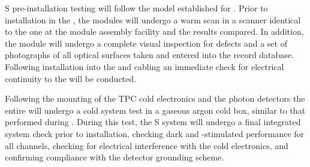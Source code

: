 S pre-installation testing will follow the model established for .  Prior to installation in the , the  modules will undergo a warm scan in a scanner identical to the one at the  module assembly facility and the results compared.  In addition, the module will undergo a complete visual inspection for defects and a set of photographs of all optical surfaces taken and entered into the  record database.  Following installation into the  and cabling an immediate check for electrical continuity to the  will be conducted.

Following the mounting of the TPC cold electronics and the photon detectors the entire  will undergo a cold system test in a gaseous argon cold box, similar to that performed during .  During this test, the S system will undergo a final integrated system check prior to installation, checking dark and -stimulated  performance for all channels, checking for electrical interference with the cold electronics, and confirming compliance with the detector grounding scheme.
